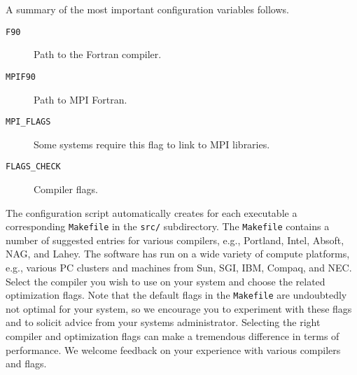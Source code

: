 \noindent
A summary of the most important configuration variables follows.
\begin{description}
\item [{\texttt{F90}}] Path to the Fortran compiler.

\item [{\texttt{MPIF90}}] Path to MPI Fortran.

\item [{\texttt{MPI\_FLAGS}}] Some systems require this flag to link to
MPI libraries.

\item [{\texttt{FLAGS\_CHECK}}] Compiler flags.
\end{description}
%
The configuration script automatically creates for each executable
a corresponding \texttt{Makefile} in the \texttt{src/} subdirectory.
The \texttt{Makefile} contains a number of suggested entries for various
compilers, e.g., Portland, Intel, Absoft, NAG, and Lahey. The software
has run on a wide variety of compute platforms, e.g., various PC clusters
and machines from Sun, SGI, IBM, Compaq, and NEC. Select the compiler
you wish to use on your system and choose the related optimization
flags. Note that the default flags in the \texttt{Makefile} are undoubtedly
not optimal for your system, so we encourage you to experiment with
these flags and to solicit advice from your systems administrator.
Selecting the right compiler and optimization flags can make a tremendous
difference in terms of performance. We welcome feedback on your experience
with various compilers and flags.\newline

